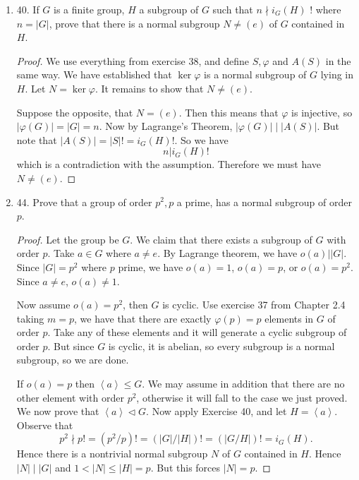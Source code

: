 \begin{enumerate}
	\item 40. If $G$ is a finite group, $H$ a subgroup of $G$ such that $n \nmid i_G(H)$ ! where $n=|G|$, prove that there is a normal subgroup $N \neq(e)$ of $G$ contained in $H$.
\begin{proof}
	We use everything from exercise 38, and define $S, \varphi$ and $A(S)$ in the same way. We have established that $\operatorname{ker} \varphi$ is a normal subgroup of $G$ lying in $H$. Let $N = \operatorname{ker} \varphi$. It remains to show that $N \neq  (e)$.

	Suppose the opposite, that $N = (e)$. 
	Then this means that $\varphi$ is injective, so $|\varphi(G)| = |G| = n$.
	Now by Lagrange's Theorem, $|\varphi(G)| \mid |A(S)|$. But note that $|A(S)| = |S|! = i_G(H)!$. So we have \[
		n | i_G(H)!
	\] 
	which is a contradiction with the assumption. Therefore we must have  $N \neq  (e)$.
\end{proof}

\newpage
\item 44. Prove that a group of order $p^2, p$ a prime, has a normal subgroup of order $p$. 
\begin{proof}
	Let the group be $G$. We claim that there exists a subgroup of $G$ with order $p$. Take $a \in G$ where $a \neq e$. By Lagrange theorem, we have $o(a) | |G|$. Since $|G| = p^2$ where $p $ prime, we have $o(a) = 1$, $o(a) = p$, or $o(a) = p^2$. Since $a \neq e$, $o(a)\neq 1$. 

	Now assume $o(a) = p^2$, then $G$ is cyclic. Use exercise 37 from Chapter 2.4 taking $m = p$, we have that there are exactly $\varphi(p) = p$ elements in $G$ of order $p$. Take any of these elements and it will generate a cyclic subgroup of order $p$.
	But since $G$ is cyclic, it is abelian, so every subgroup is a normal subgroup, so we are done.

	If $o(a) = p$ then $\left\langle a \right\rangle \le G$. We may assume in addition that there are no other element with order $p^2$, otherwise it will fall to the case we just proved. We now prove that $\left\langle a \right\rangle \triangleleft G$. Now apply Exercise 40, and let $H = \left\langle a \right\rangle $. Observe that \[
		p^2 \nmid p! = (p^2 / p)! = (|G| / |H|)! = (|G / H|)! = i_G(H)
	.\] 
	Hence there is a nontrivial normal subgroup $N$ of $G$ contained in $H$. Hence $|N| \mid |G|$ and $1 < |N| \le  |H| = p$. But this forces $|N| = p$.


\end{proof}

\end{enumerate}
